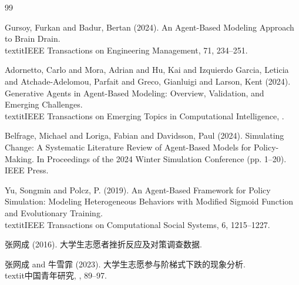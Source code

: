 \documentclass[12pt,a4paper]{article}
\begin{document}
\begin{thebibliography}{99}
\item Gursoy, Furkan and Badur, Bertan (2024). An Agent-Based Modeling Approach to Brain Drain. \\textit{IEEE Transactions on Engineering Management}, 71, 234--251.

\item Adornetto, Carlo and Mora, Adrian and Hu, Kai and Izquierdo Garcia, Leticia and Atchade-Adelomou, Parfait and Greco, Gianluigi and Larson, Kent (2024). Generative Agents in Agent-Based Modeling: Overview, Validation, and Emerging Challenges. \\textit{IEEE Transactions on Emerging Topics in Computational Intelligence}, .

\item Belfrage, Michael and Loriga, Fabian and Davidsson, Paul (2024). Simulating Change: A Systematic Literature Review of Agent-Based Models for Policy-Making. In Proceedings of the 2024 Winter Simulation Conference (pp. 1--20). IEEE Press.

\item Yu, Songmin and Polcz, P. (2019). An Agent-Based Framework for Policy Simulation: Modeling Heterogeneous Behaviors with Modified Sigmoid Function and Evolutionary Training. \\textit{IEEE Transactions on Computational Social Systems}, 6, 1215--1227.

\item 张网成 (2016). 大学生志愿者挫折反应及对策调查数据.

\item 张网成 and 牛雪霏 (2023). 大学生志愿参与阶梯式下跌的现象分析. \\textit{中国青年研究}, , 89--97.

\end{thebibliography}
\end{document}
